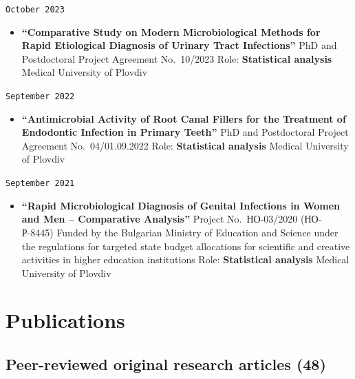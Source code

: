 \documentclass[
  10.5pt,
  a4paper,
  DIV=11,
  numbers=noendperiod]{scrartcl}
\providecommand{\tightlist}{%
  \setlength{\itemsep}{0pt}\setlength{\parskip}{0pt}}
\let\oldtexttt\texttt
\renewcommand{\texttt}[1]{{\color{cvbronze}\small\oldtexttt{#1}}}
\begin{document}
\texttt{October\ 2023}

\begin{itemize}
\tightlist
\item
  \textbf{``Comparative Study on Modern Microbiological Methods for
  Rapid Etiological Diagnosis of Urinary Tract Infections''} \textbar{}
  PhD and Postdoctoral Project \textbar{} Agreement No.~10/2023
  \textbar{} Role: \textbf{Statistical analysis} \textbar{} Medical
  University of Plovdiv
\end{itemize}

\texttt{September\ 2022}

\begin{itemize}
\tightlist
\item
  \textbf{``Antimicrobial Activity of Root Canal Fillers for the
  Treatment of Endodontic Infection in Primary Teeth''} \textbar{} PhD
  and Postdoctoral Project \textbar{} Agreement No.~04/01.09.2022
  \textbar{} Role: \textbf{Statistical analysis} \textbar{} Medical
  University of Plovdiv
\end{itemize}

\texttt{September\ 2021}

\begin{itemize}
\tightlist
\item
  \textbf{``Rapid Microbiological Diagnosis of Genital Infections in
  Women and Men -- Comparative Analysis''} \textbar{} Project
  No.~НО-03/2020 (НО-Р-8445) \textbar{} Funded by the Bulgarian Ministry
  of Education and Science under the regulations for targeted state
  budget allocations for scientific and creative activities in higher
  education institutions \textbar{} Role: \textbf{Statistical analysis}
  \textbar{} Medical University of Plovdiv
\end{itemize}

\section{Publications}\label{publications}

\subsection{Peer-reviewed original research articles
(48)}\label{peer-reviewed-original-research-articles-48}
\end{document}
